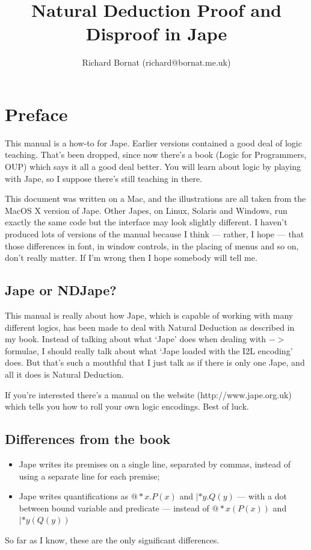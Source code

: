 \documentclass[11pt]{book}
\title{\huge Natural Deduction Proof and Disproof in Jape}
\author{Richard Bornat (richard@bornat.me.uk)}
\begin{document}
\maketitle

\chapter*{Preface}

This manual is a how-to for Jape. Earlier versions contained a good deal of logic teaching. That's been dropped, since now there's a book (Logic for Programmers, OUP) which says it all a good deal better. You will learn about logic by playing with Jape, so I suppose there's still teaching in there.

This document was written on a Mac, and the illustrations are all taken from the MacOS X version of Jape. Other Japes, on Linux, Solaris and Windows, run exactly the same code but the interface may look slightly different. I haven't produced lots of versions of the manual because I think --- rather, I hope --- that those differences in font, in window controls, in the placing of menus and so on, don't really matter. If I'm wrong then I hope somebody will tell me.

\section*{Jape or NDJape?}

This manual is really about how Jape, which is capable of working with many different logics, has been made to deal with Natural Deduction as described in my book. Instead of talking about what `Jape' does when dealing with $->$ formulae, I should really talk about what `Jape loaded with the I2L encoding' does. But that's such a mouthful that I just talk as if there is only one Jape, and all it does is Natural Deduction.

If you're interested there's a manual on the website (http://www.jape.org.uk) which tells you how to roll your own logic encodings. Best of luck.

\section{Differences from the book}
\begin{itemize}
\item Jape writes its premises on a single line, separated by commas, instead of using a separate line for each premise;
\item Jape writes quantifications as $@*x.P(x)$ and $|*y.Q(y)$ --- with a dot between bound variable and predicate --- instead of $@*x(P(x))$ and $|*y(Q(y))$
\end{itemize}
So far as I know, these are the only significant differences.
\end{document}

